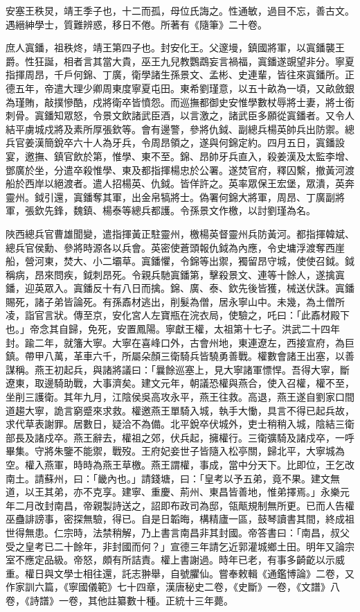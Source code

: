 安塞王秩炅，靖王季子也，十二而孤，母位氏誨之。性通敏，過目不忘，善古文。遇縉紳學士，質難辨惑，移日不倦。所著有《隨筆》二十卷。

庶人寘鐇，祖秩炵，靖王第四子也。封安化王。父邃墁，鎮國將軍，以寘鐇襲王爵。性狂誕，相者言其當大貴，巫王九兒教鸚鵡妄言禍福，寘鐇遂覬望非分。寧夏指揮周昂，千戶何錦、丁廣，衛學諸生孫景文、孟彬、史連輩，皆往來寘鐇所。正德五年，帝遣大理少卿周東度寧夏屯田。東希劉瑾意，以五十畝為一頃，又畝斂銀為瑾賄，敲撲慘酷，戍將衛卒皆憤怨。而巡撫都御史安惟學數杖辱將士妻，將士銜刺骨。寘鐇知眾怒，令景文飲諸武臣酒，以言激之，諸武臣多願從寘鐇者。又令人結平虜城戍將及素所厚張欽等。會有邊警，參將仇鉞、副總兵楊英帥兵出防禦。總兵官姜漢簡銳卒六十人為牙兵，令周昂領之，遂與何錦定約。四月五日，寘鐇設宴，邀撫、鎮官飲於第，惟學、東不至。錦、昂帥牙兵直入，殺姜漢及太監李增、鄧廣於坐，分遣卒殺惟學、東及都指揮楊忠於公署。遂焚官府，釋囚繫，撤黃河渡船於西岸以絕渡者。遣人招楊英、仇鉞。皆佯許之。英率眾保王宏堡，眾潰，英奔靈州。鉞引還，寘鐇奪其軍，出金帛犒將士。偽署何錦大將軍，周昂、丁廣副將軍，張欽先鋒，魏鎮、楊泰等總兵都護。令孫景文作檄，以討劉瑾為名。

陜西總兵官曹雄聞變，遣指揮黃正駐靈州，檄楊英督靈州兵防黃河。都指揮韓斌、總兵官侯勳、參將時源各以兵會。英密使蒼頭報仇鉞為內應，令史墉浮渡奪西崖船，營河東，焚大、小二壩草。寘鐇懼，令錦等出禦，獨留昂守城，使使召鉞。鉞稱病，昂來問疾，鉞刺昂死。令親兵馳寘鐇第，擊殺景文、連等十餘人，遂擒寘鐇，迎英眾入。寘鐇反十有八日而擒。錦、廣、泰、欽先後皆獲，械送伏誅。寘鐇賜死，諸子弟皆論死。有孫鼒材逃出，削髮為僧，居永寧山中。未幾，為土僧所凌，詣官言狀。傳至京，安化宮人左寶瓶在浣衣局，使驗之，吒曰：「此鼒材殿下也。」帝念其自歸，免死，安置鳳陽。寧獻王權，太祖第十七子。洪武二十四年封。踰二年，就籓大寧。大寧在喜峰口外，古會州地，東連遼左，西接宣府，為巨鎮。帶甲八萬，革車六千，所屬朵顏三衛騎兵皆驍勇善戰。權數會諸王出塞，以善謀稱。燕王初起兵，與諸將議曰：「曩餘巡塞上，見大寧諸軍慓悍。吾得大寧，斷遼東，取邊騎助戰，大事濟矣。建文元年，朝議恐權與燕合，使入召權，權不至，坐削三護衛。其年九月，江陰侯吳高攻永平，燕王往救。高退，燕王遂自劉家口間道趨大寧，詭言窮蹙來求救。權邀燕王單騎入城，執手大慟，具言不得已起兵故，求代草表謝罪。居數日，疑洽不為備。北平銳卒伏城外，吏士稍稍入城，陰結三衛部長及諸戍卒。燕王辭去，權祖之郊，伏兵起，擁權行。三衛彍騎及諸戍卒，一呼畢集。守將朱鑒不能禦，戰歿。王府妃妾世子皆隨入松亭關，歸北平，大寧城為空。權入燕軍，時時為燕王草檄。燕王謂權，事成，當中分天下。比即位，王乞改南土。請蘇州，曰：「畿內也。」請錢塘，曰：「皇考以予五弟，竟不果。建文無道，以王其弟，亦不克享。建寧、重慶、荊州、東昌皆善地，惟弟擇焉。」永樂元年二月改封南昌，帝親製詩送之，詔即布政司為邸，瓴甋規制無所更。已而人告權巫蠱誹謗事，密探無驗，得已。自是日韜晦，構精廬一區，鼓琴讀書其間，終成祖世得無患。仁宗時，法禁稍解，乃上書言南昌非其封國。帝答書曰：「南昌，叔父受之皇考已二十餘年，非封國而何？」宣德三年請乞近郭灌城鄉土田。明年又論宗室不應定品級。帝怒，頗有所詰責。權上書謝過。時年已老，有事多齮齕以示威重。權日與文學士相往還，託志翀舉，自號臞仙。嘗奉敕輯《通鑑博論》二卷，又作家訓六篇，《寧國儀範》七十四章，漢唐秘史二卷，《史斷》一卷，《文譜》八卷，《詩譜》一卷，其他註纂數十種。正統十三年薨。

